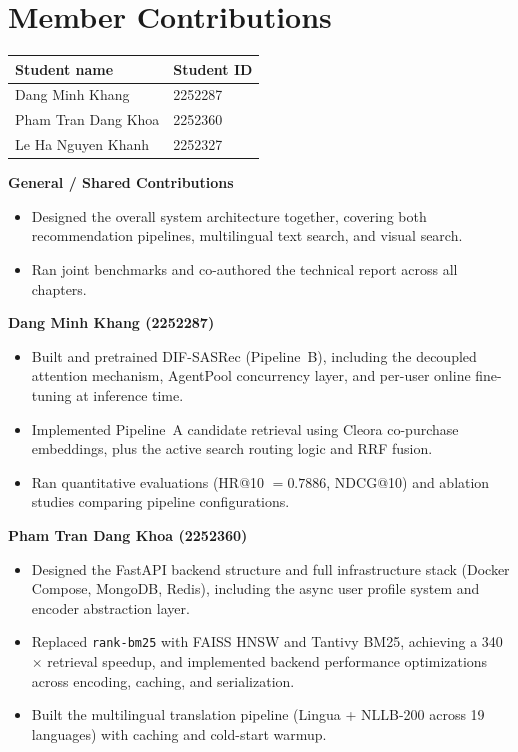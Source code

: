 \chapter*{Member Contributions}

\noindent
\begin{tabular}{@{}p{5cm} p{8.5cm}@{}}
\textbf{Student name} & \textbf{Student ID} \\
\hline
Dang Minh Khang  & 2252287 \\
Pham Tran Dang Khoa & 2252360 \\
Le Ha Nguyen Khanh & 2252327 \\
\hline
\end{tabular}

\vspace{1.5em}

\noindent\textbf{General / Shared Contributions}

\begin{itemize}
    \item Designed the overall system architecture together, covering both recommendation pipelines, multilingual text search, and visual search.
    \item Ran joint benchmarks and co-authored the technical report across all chapters.
\end{itemize}

\vspace{1em}

\noindent\textbf{Dang Minh Khang (2252287)}

\begin{itemize}
    \item Built and pretrained DIF-SASRec (Pipeline~B), including the decoupled attention mechanism, AgentPool concurrency layer, and per-user online fine-tuning at inference time.
    \item Implemented Pipeline~A candidate retrieval using Cleora co-purchase embeddings, plus the active search routing logic and RRF fusion.
    \item Ran quantitative evaluations (HR@10 $= 0.7886$, NDCG@10) and ablation studies comparing pipeline configurations.
\end{itemize}

\vspace{0.5em}

\noindent\textbf{Pham Tran Dang Khoa (2252360)}

\begin{itemize}
    \item Designed the FastAPI backend structure and full infrastructure stack (Docker Compose, MongoDB, Redis), including the async user profile system and encoder abstraction layer.
    \item Replaced \texttt{rank-bm25} with FAISS HNSW and Tantivy BM25, achieving a 340$\times$ retrieval speedup, and implemented backend performance optimizations across encoding, caching, and serialization.
    \item Built the multilingual translation pipeline (Lingua + NLLB-200 across 19 languages) with caching and cold-start warmup.
\end{itemize}

